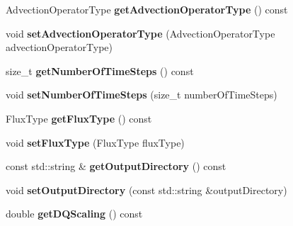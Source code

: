 \begin{DoxyCompactItemize}
\item 
\hypertarget{classnatrium_1_1SolverConfiguration_a4fcdac4c96a9ad187b977cc5c1828e0e}{Advection\-Operator\-Type {\bfseries get\-Advection\-Operator\-Type} () const }\label{classnatrium_1_1SolverConfiguration_a4fcdac4c96a9ad187b977cc5c1828e0e}

\item 
\hypertarget{classnatrium_1_1SolverConfiguration_ae29272c0bf8fb87893ca9f4490b1e532}{void {\bfseries set\-Advection\-Operator\-Type} (Advection\-Operator\-Type advection\-Operator\-Type)}\label{classnatrium_1_1SolverConfiguration_ae29272c0bf8fb87893ca9f4490b1e532}

\item 
\hypertarget{classnatrium_1_1SolverConfiguration_a17f8418a66eb2df556ada3ac0897e3c4}{size\-\_\-t {\bfseries get\-Number\-Of\-Time\-Steps} () const }\label{classnatrium_1_1SolverConfiguration_a17f8418a66eb2df556ada3ac0897e3c4}

\item 
\hypertarget{classnatrium_1_1SolverConfiguration_a3e82a2c57d7a952f8f6e26838f07eefb}{void {\bfseries set\-Number\-Of\-Time\-Steps} (size\-\_\-t number\-Of\-Time\-Steps)}\label{classnatrium_1_1SolverConfiguration_a3e82a2c57d7a952f8f6e26838f07eefb}

\item 
\hypertarget{classnatrium_1_1SolverConfiguration_a8cb8f579ce1a4e9d5619795ae3598126}{Flux\-Type {\bfseries get\-Flux\-Type} () const }\label{classnatrium_1_1SolverConfiguration_a8cb8f579ce1a4e9d5619795ae3598126}

\item 
\hypertarget{classnatrium_1_1SolverConfiguration_aeef6044ffe9400d2214078b79a44343e}{void {\bfseries set\-Flux\-Type} (Flux\-Type flux\-Type)}\label{classnatrium_1_1SolverConfiguration_aeef6044ffe9400d2214078b79a44343e}

\item 
\hypertarget{classnatrium_1_1SolverConfiguration_a418057140bd0717a2e276a41328e043f}{const std\-::string \& {\bfseries get\-Output\-Directory} () const }\label{classnatrium_1_1SolverConfiguration_a418057140bd0717a2e276a41328e043f}

\item 
\hypertarget{classnatrium_1_1SolverConfiguration_acd249488bb83773514c4d6917b5bfc3a}{void {\bfseries set\-Output\-Directory} (const std\-::string \&output\-Directory)}\label{classnatrium_1_1SolverConfiguration_acd249488bb83773514c4d6917b5bfc3a}

\item 
\hypertarget{classnatrium_1_1SolverConfiguration_a2c71a2baa4134c00a9d51962c0858608}{double {\bfseries get\-D\-Q\-Scaling} () const }\label{classnatrium_1_1SolverConfiguration_a2c71a2baa4134c00a9d51962c0858608}


\end{DoxyCompactItemize}

